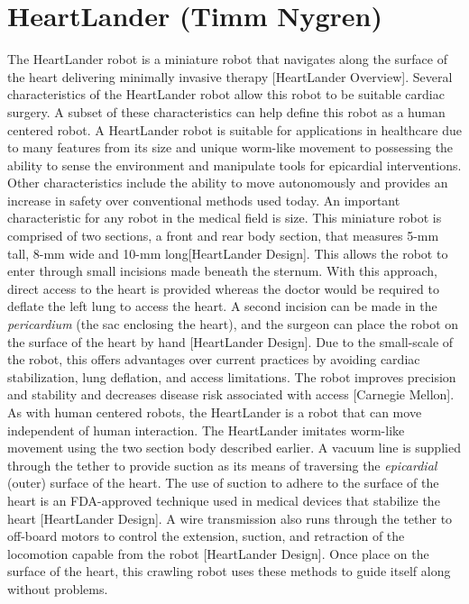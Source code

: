 \documentclass[11pt,conference]{IEEEtran}
\begin{document}
\section{ HeartLander (Timm Nygren)}

\indent The HeartLander robot is a miniature robot that navigates along the surface of the heart delivering minimally invasive therapy [HeartLander Overview]. Several characteristics of the HeartLander robot allow this robot to be suitable cardiac surgery. A subset of these characteristics can help define this robot as a human centered robot. A HeartLander robot is suitable for applications in healthcare due to many features from its size and unique worm-like movement to possessing the ability to sense the environment and manipulate tools for epicardial interventions. Other characteristics include the ability to move autonomously and provides an increase in safety over conventional methods used today.
\newline
\indent An important characteristic for any robot in the medical field is size. This  miniature robot is comprised of two sections, a front and rear body section, that measures 5-mm tall, 8-mm wide and 10-mm long[HeartLander Design]. This allows the robot to enter through small incisions made beneath the sternum. With this approach, direct access to the heart is provided whereas the doctor would be required to deflate the left lung to access the heart. A second incision can be made in the \textit{pericardium} (the sac enclosing the heart), and the surgeon can place the robot on the surface of the heart by hand [HeartLander Design]. Due to the small-scale of the robot, this offers advantages over current practices by avoiding cardiac stabilization, lung deflation, and access limitations. The robot improves precision and stability and decreases disease risk associated with access [Carnegie Mellon].
\newline
\indent As with human centered robots, the HeartLander is a robot that can move independent of human interaction. The HeartLander imitates worm-like movement using the two section body described earlier. A vacuum line is supplied through the tether to provide suction as its means of traversing the \textit{epicardial} (outer) surface of the heart. The use of suction to adhere to the surface of the heart is an FDA-approved technique used in medical devices that stabilize the heart [HeartLander Design]. A wire transmission also runs through the tether to off-board motors to control the extension, suction, and retraction of the locomotion capable from the robot [HeartLander Design]. Once place on the surface of the heart, this crawling robot uses these methods to guide itself along without problems.
\end{document}
